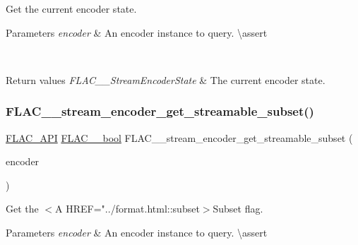 Get the current encoder state.


\begin{DoxyParams}{Parameters}
{\em encoder} & An encoder instance to query. \textbackslash{}assert 
\begin{DoxyCode}{1}
\end{DoxyCode}
 \\
\hline
\end{DoxyParams}

\begin{DoxyRetVals}{Return values}
{\em F\+L\+A\+C\+\_\+\+\_\+\+Stream\+Encoder\+State} & The current encoder state. \\
\hline
\end{DoxyRetVals}
\mbox{\label{group__flac__stream__encoder_gabafaf69ed39c25c5b1c03044c1a91d66}} 
\subsubsection{\texorpdfstring{FLAC\_\_stream\_encoder\_get\_streamable\_subset()}{FLAC\_\_stream\_encoder\_get\_streamable\_subset()}}
{\footnotesize\ttfamily \mbox{\hyperlink{group__flac__export_ga56ca07df8a23310707732b1c0007d6f5}{F\+L\+A\+C\+\_\+\+A\+PI}} \mbox{\hyperlink{ordinals_8h_a95103469f1cbd78b8cf250194985b34e}{F\+L\+A\+C\+\_\+\+\_\+bool}} F\+L\+A\+C\+\_\+\+\_\+stream\+\_\+encoder\+\_\+get\+\_\+streamable\+\_\+subset (\begin{DoxyParamCaption}\item[{const \mbox{\hyperlink{struct_f_l_a_c_____stream_encoder}{F\+L\+A\+C\+\_\+\+\_\+\+Stream\+Encoder}} $\ast$}]{encoder }\end{DoxyParamCaption})}

Get the $<$A H\+R\+EF="../format.html\+::subset$>$Subset flag.


\begin{DoxyParams}{Parameters}
{\em encoder} & An encoder instance to query. \textbackslash{}assert 
\begin{DoxyCode}{1}
\end{DoxyCode}
 \\
\hline
\end{DoxyParams}

